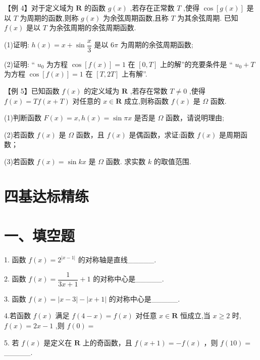 【例 4】对于定义域为 $\mathbf{R}$ 的函数 $g\left( x\right)$ ,若存在正常数 $T$ ,使得 $\cos \left\lbrack  {g\left( x\right) }\right\rbrack$ 是以 $T$ 为周期的函数,则称 $g\left( x\right)$ 为余弦周期函数,且称 $T$ 为其余弦周期. 已知 $f\left( x\right)$ 是以 $T$ 为余弦周期的余弦周期函数.

(1)证明: $h\left( x\right)  = x + \sin \dfrac{x}{3}$ 是以 ${6\pi }$ 为周期的余弦周期函数;

(2)证明: “ ${u}_{0}$ 为方程 $\cos \left\lbrack  {f\left( x\right) }\right\rbrack   = 1$ 在 $\left\lbrack  {0,T}\right\rbrack$ 上的解”的充要条件是 “ ${u}_{0} + T$ 为方程 $\cos \left\lbrack  {f\left( x\right) }\right\rbrack   = 1$ 在 $\left\lbrack  {T,{2T}}\right\rbrack$ 上有解”.

【例 5】已知函数 $f\left( x\right)$ 的定义域为 $\mathbf{R}$ ,若存在常数 $T \neq  0$ ,使得 $f\left( x\right)  = {Tf}\left( {x + T}\right)$ 对任意的 $x \in  \mathbf{R}$ 成立,则称函数 $f\left( x\right)$ 是 $\Omega$ 函数.

(1)判断函数 $F\left( x\right)  = x,h\left( x\right)  = \sin {\pi x}$ 是否是 $\Omega$ 函数，请说明理由;

(2)若函数 $f\left( x\right)$ 是 $\Omega$ 函数，且 $f\left( x\right)$ 是偶函数，求证:函数 $f\left( x\right)$ 是周期函数；

(3)若函数 $f\left( x\right)  = \sin {kx}$ 是 $\Omega$ 函数. 求实数 $k$ 的取值范围.

\section*{四基达标精练}

\section*{一、填空题}

1. 函数 $f\left( x\right)  = {2}^{\left| x - 1\right| }$ 的对称轴是直线\_\_\_\_\_.

2. 函数 $f\left( x\right)  = \dfrac{1}{{3x} + 1} + 1$ 的对称中心是\_\_\_\_\_.

3. 函数 $f\left( x\right)  = \left| {x - 3}\right|  - \left| {x + 1}\right|$ 的对称中心是\_\_\_\_\_.

4.若函数 $f\left( x\right)$ 满足 $f\left( {4 - x}\right)  = f\left( x\right)$ 对任意 $x \in  \mathbf{R}$ 恒成立,当 $x \geq  2$ 时, $f\left( x\right)  = {2x} - 1$ ,则 $f\left( 0\right)  =$

5. 若 $f\left( x\right)$ 是定义在 $\mathbf{R}$ 上的奇函数，且 $f\left( {x + 1}\right)  =  - f\left( x\right)$ ，则 $f\left( {10}\right)  =$ \_\_\_\_\_.

